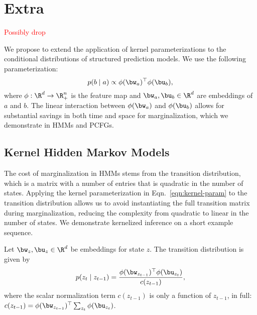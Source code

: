 
\section{Extra}


\textcolor{red}{Possibly drop}



We propose to extend the application of kernel parameterizations to the conditional distributions of structured prediction models.
We use the following parameterization:
\begin{equation}
    \label{eqn:kernel-param}
    p(b \mid a) \propto \phi(\bw_a)^\top\phi(\bu_b),
\end{equation}
where $\phi: \R^d \to \R^n_+$ is the feature map and $\bw_a,\bu_b\in\R^d$ are embeddings of $a$ and $b$.
The linear interaction between $\phi(\bw_a)$ and $\phi(\bu_b)$ allows for substantial savings in both time and space for marginalization, which we demonstrate in HMMs and PCFGs.

\subsection*{Kernel Hidden Markov Models}
The cost of marginalization in HMMs stems from the transition distribution, which is a matrix with a number of entries that is quadratic in the number of states.
Applying the kernel parameterization in Eqn.~\ref{eqn:kernel-param} to the transition distribution allows us to avoid instantiating the full transition matrix during marginalization, reducing the complexity from quadratic to linear in the number of states. We demonstrate kernelized inference on a short example sequence.

Let $\bw_z,\bu_z\in\R^d$ be embeddings for state $z$. The transition distribution is given by
\begin{equation}
p(z_t \mid z_{t-1})
= \frac{\phi(\bw_{z_{t-1}})^\top\phi(\bu_{z_t})}{c(z_{t-1})},
\end{equation}
where the scalar normalization term $c(z_{t-1})$ is only a function of $z_{t-1}$, in full:
$c(z_{t-1}) =\phi(\bw_{z_{t-1}})^\top \sum_{z_t}\phi(\bu_{z_{t}})$.

